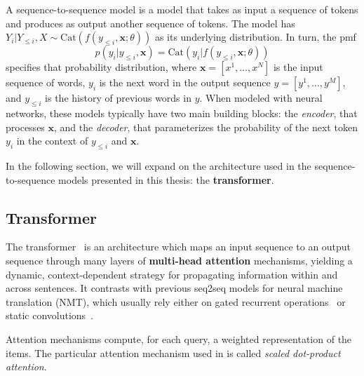 \begin{definition}
    A sequence-to-sequence model is a model that takes as input a
    sequence of tokens and produces as output another sequence of tokens.
    The model has $Y_i | Y_{\leq i}, X \sim \text{Cat}(f(y_{\leq i}, \bm{x};
        \theta))$ as its underlying distribution. In turn, the pmf
    \begin{equation}
        p(y_i|y_{\leq i}, \bm{x}) = \text{Cat}(y_i|f(y_{\leq i}, \bm{x}; \theta))
    \end{equation}
    specifies that probability distribution, where
    $\bm{x}=[x^1, \dots, x^N]$ is the input sequence of words,
    $y_i$ is the next word in the output sequence $y=[y^1, \dots, y^M]$,
    and $y_{\leq i}$ is the history of previous words in $y$.
    When modeled with neural networks, these models typically have
    two main building blocks: the \textit{encoder}, that processes $\bm{x}$,
    and the \textit{decoder}, that parameterizes the probability of the next
    token $y_i$ in the context of $y_{\leq i}$ and $\bm{x}$.
\end{definition}

In the following section, we will expand on the architecture used in
the sequence-to-sequence models presented in this thesis: the \textbf{transformer}.

\subsection{Transformer}
\label{sec:transformer_bg}

\noindent The transformer~\citep{vaswani2017attention} is an architecture which
maps an input sequence to an output sequence through many layers of
\textbf{multi-head attention} mechanisms, yielding a dynamic,
context-dependent strategy for propagating information within and
across sentences. It contrasts with previous seq2seq models for neural machine translation (NMT), which
usually rely either on gated recurrent operations~\citep[often
    LSTMs:][]{bahdanau2014neural,luong2015effective} or static
convolutions~\citep{convseq}.

Attention mechanisms compute, for each query, a weighted
representation of the items. The particular attention mechanism used
in \citet{vaswani2017attention} is called \emph{scaled dot-product
    attention}.

